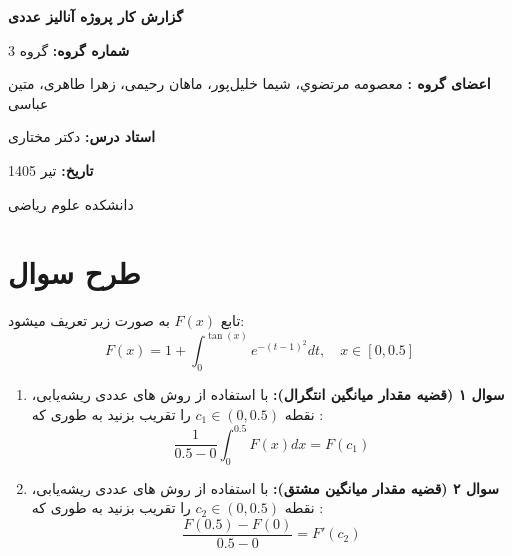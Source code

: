 \documentclass[12pt,a4paper]{article}
\begin{document}
\begin{titlepage}
    \centering
    \vspace*{2cm}
    {\Huge \bfseries گزارش کار پروژه آنالیز عددی \par}
    \vspace{1.5cm}
    
    {\large
    \vspace{0.4cm}
    \textbf{شماره گروه:} گروه 3\par
    \vspace{0.4cm}
    \textbf{اعضای گروه :} معصومه مرتضوي، شیما خلیل‌پور، ماهان رحیمی، زهرا طاهری، متین عباسی \par
    \vspace{0.4cm}
    \textbf{استاد درس:} دکتر مختاری \par
    \vspace{0.4cm}
    \textbf{تاریخ: }تیر 1405 \par
    }
    
    \vfill
    {\small دانشکده علوم ریاضی \par}
\end{titlepage}

\newpage
\tableofcontents
\newpage
\section*{طرح سوال}
تابع $F(x)$ به صورت زیر تعریف میشود:
\begin{equation*}
F(x) = 1 + \int_{0}^{\tan(x)}  e^{-(t-1)^2}dt , \quad x \in [0, 0.5]
\end{equation*}

\begin{enumerate}
    \item \textbf{سوال ۱ (قضیه مقدار میانگین انتگرال):} با استفاده از روش های عددی ریشه‌یابی، نقطه $c_1 \in (0,0.5)$ را تقریب بزنید به طوری که :
    \begin{equation*}
    \frac{1}{0.5-0}\int_{0}^{0.5} F(x)dx = F(c_1)
    \end{equation*}
    \item \textbf{سوال ۲ (قضیه مقدار میانگین مشتق):} با استفاده از روش های عددی ریشه‌یابی، نقطه $c_2 \in (0,0.5)$ را تقریب بزنید به طوری که :
    \begin{equation*}
    \frac{F(0.5) - F(0)}{0.5 - 0} = F'(c_2)
    \end{equation*}
\end{enumerate}
\end{document}
